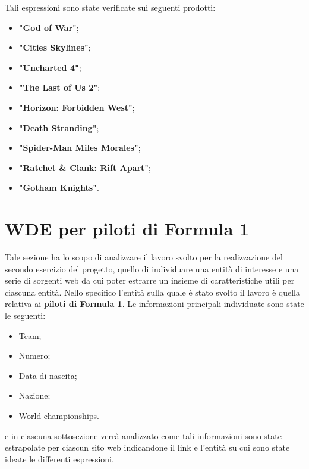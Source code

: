 \documentclass[12pt, letterpaper]{article}
\begin{document}
Tali espressioni sono state verificate sui seguenti prodotti: 
\begin{itemize}
	\item \textbf{"God of War"};
	\item \textbf{"Cities Skylines"};
	\item \textbf{"Uncharted 4"};
	\item \textbf{"The Last of Us 2"};
	\item \textbf{"Horizon: Forbidden West"};
	\item \textbf{"Death Stranding"};
	\item \textbf{"Spider-Man Miles Morales"};
	\item \textbf{"Ratchet \& Clank: Rift Apart"};
	\item \textbf{"Gotham Knights"}.
	
\end{itemize}

\section{WDE per piloti di Formula 1}\label{sezione2}
Tale sezione ha lo scopo di analizzare il lavoro svolto per la realizzazione del secondo esercizio del progetto, quello di individuare una entità di interesse e una serie di sorgenti web da cui poter estrarre un insieme di caratteristiche utili per ciascuna entità. Nello specifico l'entità sulla quale è stato svolto il lavoro è quella relativa ai \textbf{piloti di Formula 1}. Le informazioni principali individuate sono state le seguenti:
\begin{itemize}
    \item Team;
    \item Numero;
    \item Data di nascita;
    \item Nazione;
    \item World championships.
\end{itemize}
e in ciascuna sottosezione verrà analizzato come tali informazioni sono state estrapolate per ciascun sito web indicandone il link e l'entità su cui sono state ideate le differenti espressioni.
\end{document}
